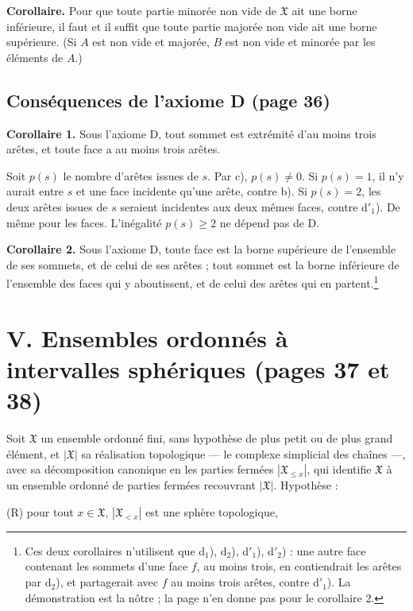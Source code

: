\documentclass[11pt,a4paper]{article}
\begin{document}
\textbf{Corollaire.} Pour que toute partie minorée non vide de $\mathfrak{X}$
ait une borne inférieure, il faut et il suffit que toute partie majorée non vide
ait une borne supérieure. (Si $A$ est non vide et majorée, $B$ est non vide et
minorée par les éléments de $A$.)

\subsection*{Conséquences de l'axiome D (page 36)}

\textbf{Corollaire 1.} Sous l'axiome D, tout sommet est extrémité d'au moins
trois arêtes, et toute face a au moins trois arêtes.

Soit $p(s)$ le nombre d'arêtes issues de $s$. Par c), $p(s) \neq 0$. Si
$p(s) = 1$, il n'y aurait entre $s$ et une face incidente qu'une arête, contre
b). Si $p(s) = 2$, les deux arêtes issues de $s$ seraient incidentes aux deux
mêmes faces, contre d$'_{1}$). De même pour les faces. L'inégalité $p(s) \geq 2$
ne dépend pas de D.

\textbf{Corollaire 2.} Sous l'axiome D, toute face est la borne supérieure de
l'ensemble de ses sommets, et de celui de ses arêtes ; tout sommet est la borne
inférieure de l'ensemble des faces qui y aboutissent, et de celui des arêtes
qui en partent.\footnote{Ces deux corollaires n'utilisent que d$_{1}$),
d$_{2}$), d$'_{1}$), d$'_{2}$) : une autre face contenant les sommets d'une face
$f$, au moins trois, en contiendrait les arêtes par d$_{2}$), et partagerait avec
$f$ au moins trois arêtes, contre d$'_{1}$). La démonstration est la nôtre ; la
page n'en donne pas pour le corollaire 2.}

\section*{V. Ensembles ordonnés à intervalles sphériques (pages 37 et 38)}

Soit $\mathfrak{X}$ un ensemble ordonné fini, sans hypothèse de plus petit ou de
plus grand élément, et $|\mathfrak{X}|$ sa réalisation topologique --- le
complexe simplicial des chaînes ---, avec sa décomposition canonique en les
parties fermées $|\mathfrak{X}_{\leq x}|$, qui identifie $\mathfrak{X}$ à un
ensemble ordonné de parties fermées recouvrant $|\mathfrak{X}|$. Hypothèse :

(R) pour tout $x \in \mathfrak{X}$, $|\mathfrak{X}_{< x}|$ est une sphère
topologique,
\end{document}
